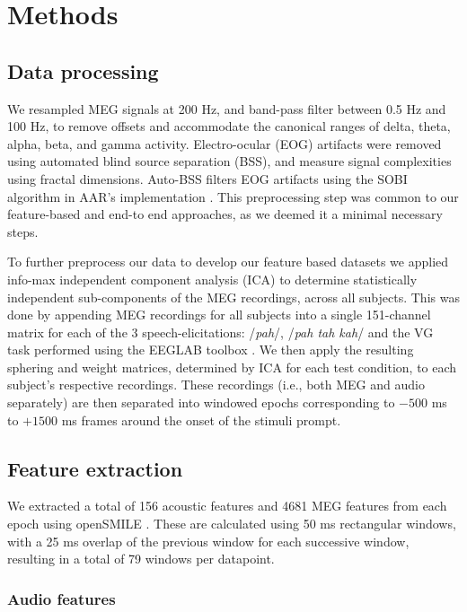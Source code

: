 \documentclass[utf8]{frontiersSCNS} %
\begin{document}
\section{Methods}


\subsection{Data processing}

We resampled MEG signals at 200 Hz, and band-pass filter between 0.5 Hz and 100 Hz, to remove offsets and accommodate the canonical ranges of delta, theta, alpha, beta, and gamma activity. Electro-ocular (EOG) artifacts were removed using automated blind source separation (BSS), and measure signal complexities using fractal dimensions. Auto-BSS filters EOG artifacts using the SOBI algorithm in AAR's implementation \cite{eog}. This preprocessing step was common to our feature-based and end-to end approaches, as we deemed it a minimal necessary steps.

To further preprocess our data to develop our feature based datasets we applied info-max independent component analysis (ICA) \cite{Bell1995} to determine statistically independent sub-components of the MEG recordings, across all subjects. This was done by appending MEG recordings for all subjects into a single 151-channel matrix for each of the 3 speech-elicitations: /{\em pah}/, /{\em pah tah kah}/ and the VG task performed using the EEGLAB toolbox \cite{Delorme04eeglab}. We then apply the resulting sphering and weight matrices, determined by ICA for each test condition, to each subject's respective recordings. These recordings (i.e., both MEG and audio separately) are then separated into windowed epochs corresponding to $-500$ ms to $+1500$ ms frames around the onset of the stimuli prompt.

\subsection{Feature extraction}

We extracted a total of 156 acoustic features and 4681 MEG features from each epoch using openSMILE \cite{Eyben13-RDI}. These are calculated using 50 ms rectangular windows, with a 25 ms overlap of the previous window for each successive window, resulting in a total of 79 windows per datapoint.

\subsubsection{Audio features}
\end{document}
